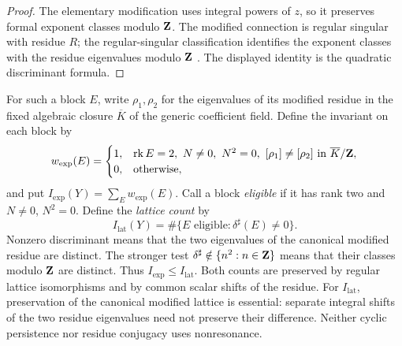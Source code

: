 \begin{proof}
The elementary modification uses integral powers of \(z\), so it preserves
formal exponent classes modulo \(\mathbf Z\).  The modified connection is regular
singular with residue \(R\); the regular-singular classification identifies
the exponent classes with the residue eigenvalues modulo \(\mathbf Z\)
\cite[Chapter~3]{PutSinger}.  The displayed identity is the quadratic
discriminant formula.
\end{proof}

For such a block \(E\), write \(\rho_1,\rho_2\) for the eigenvalues of its
modified residue in the
fixed algebraic closure \(\overline K\) of the generic coefficient field.
Define the invariant on each block by
\begin{equation}
 w_{\mathrm{exp}}(E)=
 \begin{cases}
 1,&\operatorname{rk} E=2,\ N\ne0,\ N^2=0,\
      [\rho_1]\ne[\rho_2]\text{ in }\overline K/\mathbf Z,\\
 0,&\text{otherwise},
 \end{cases}
 \label{eq:atomic-fold}
\end{equation}
and put \(I_{\mathrm{exp}}(Y)=\sum_E w_{\mathrm{exp}}(E)\).
Call a block \emph{eligible} if it has rank two and \(N\ne0\), \(N^2=0\).
Define the \emph{lattice count} by
\[
 I_{\mathrm{lat}}(Y)
 =\#\{E\text{ eligible}:\delta^\sharp(E)\ne0\}.
\]
Nonzero discriminant means that the two eigenvalues of the canonical
modified residue are distinct.  The stronger test
\(\delta^\sharp\notin\{n^2:n\in\mathbf Z\}\) means that their classes modulo
\(\mathbf Z\) are distinct.  Thus \(I_{\mathrm{exp}}\leq I_{\mathrm{lat}}\).
Both counts are preserved by regular lattice isomorphisms and by common
scalar shifts of the residue.  For \(I_{\mathrm{lat}}\), preservation of
the canonical modified lattice is essential: separate integral shifts of
the two residue eigenvalues need not preserve their difference.
Neither cyclic persistence nor residue conjugacy uses nonresonance.
